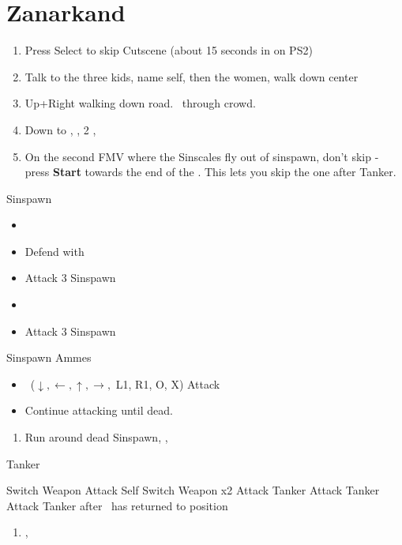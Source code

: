 \chapter{Zanarkand}

\begin{enumerate}
    \item Press Select to skip Cutscene (about 15 seconds in on PS2)
    \item Talk to the three kids, name self, then the women, walk down center
    \item Up+Right walking down road. \sd\ through crowd. \skippablefmv[2:30]
    \item Down to \auron, \sd, 2 \skippablefmv[2:30], \sd
    \item On the second FMV where the Sinscales fly out of sinspawn, don't skip - press \textbf{Start} towards the end of the \fmv. This lets you skip the one after Tanker.
\end{enumerate}
\begin{battle}{Sinspawn}
    \begin{itemize}
        \item \sd
        \item Defend with \tidus
        \item Attack 3 Sinspawn
        \item \sd
        \item Attack 3 Sinspawn
    \end{itemize}
\end{battle}
\begin{battle}[2400]{Sinspawn Ammes}
    \begin{itemize}
        \item \sd
        \auronf \od\ ($\downarrow, \leftarrow, \uparrow, \rightarrow,$ L1, R1, O, X)
        \tidusf Attack
        \tidusf \od
        \item Continue attacking until dead.
    \end{itemize}
\end{battle}
\begin{enumerate}[resume]
    \item Run around dead Sinspawn, \save, \sd
\end{enumerate}
\begin{battle}[1000]{Tanker}
    \begin{itemize}
        \tidusf Switch Weapon
        \auronf Attack Self
        \tidusf Switch Weapon x2
        \tidusf Attack Tanker
        \auronf Attack Tanker
        \tidusf Attack Tanker after \auron\ has returned to position
    \end{itemize}
\end{battle}
\begin{enumerate}[resume]
    \item \cs[2:00], \skippablefmv
\end{enumerate}